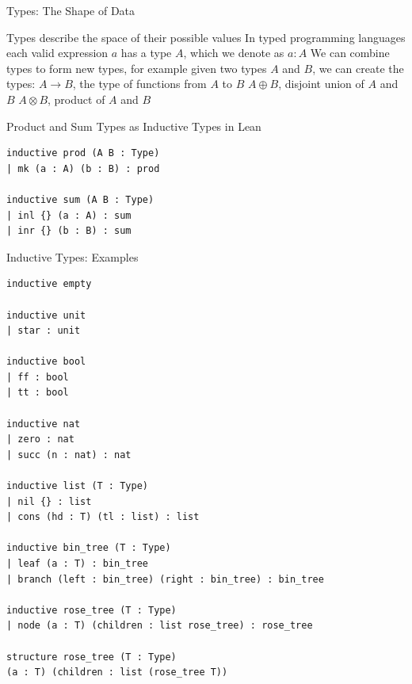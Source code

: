 \documentclass[pdf]{beamer}
\begin{document}
\begin{frame}{Types: The Shape of Data}
  \begin{outline}
    \1 Types describe the space of their possible values
    \1 In typed programming languages each valid expression $a$ has a type $A$, which we denote as $a : A$
    \1 We can combine types to form new types, for example given two types $A$ and $B$, we can create the types:
    \2 $A \to B$, the type of functions from $A$ to $B$
    \2 $A \oplus B$, disjoint union of $A$ and $B$
    \2 $A \otimes B$, product of $A$ and $B$
  \end{outline}
\end{frame}

\begin{frame}[fragile]{Product and Sum Types as Inductive Types in Lean}
  \begin{verbatim}
inductive prod (A B : Type)
| mk (a : A) (b : B) : prod

inductive sum (A B : Type)
| inl {} (a : A) : sum
| inr {} (b : B) : sum
  \end{verbatim}
\end{frame}

\begin{frame}[fragile]{Inductive Types: Examples}
  \begin{verbatim}
inductive empty

inductive unit
| star : unit

inductive bool
| ff : bool
| tt : bool

inductive nat
| zero : nat
| succ (n : nat) : nat

inductive list (T : Type)
| nil {} : list
| cons (hd : T) (tl : list) : list

inductive bin_tree (T : Type)
| leaf (a : T) : bin_tree
| branch (left : bin_tree) (right : bin_tree) : bin_tree

inductive rose_tree (T : Type)
| node (a : T) (children : list rose_tree) : rose_tree

structure rose_tree (T : Type)
(a : T) (children : list (rose_tree T))
  \end{verbatim}
\end{frame}
\end{document}
